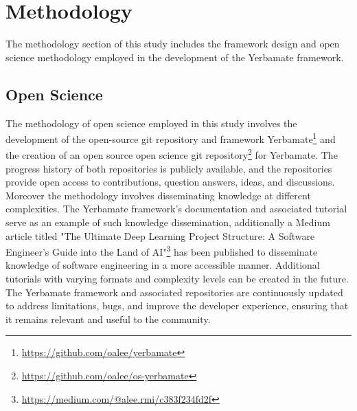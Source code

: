 


\section{Methodology}

The methodology section of this study includes the framework design and open science methodology employed in the development of the Yerbamate framework.


\subsection{Open Science}

The methodology of open science employed in this study involves the development of the open-source git repository and framework Yerbamate\footnote{\url{https://github.com/oalee/yerbamate}} and the creation of an open source open science git repository\footnote{\url{https://github.com/oalee/os-yerbamate}} for Yerbamate. The progress history of both repositories is publicly available, and the repositories provide open access to contributions, question answers, ideas, and discussions. Moreover the methodology involves disseminating knowledge at different complexities. The Yerbamate framework's documentation and associated tutorial serve as an example of such knowledge dissemination, additionally
  a Medium article titled "The Ultimate Deep Learning Project Structure: A Software Engineer’s Guide into the Land of AI"\footnote{\url{https://medium.com/@alee.rmi/c383f234fd2f}} has been published to disseminate knowledge of software engineering in a more accessible manner.
 Additional tutorials with varying formats and complexity levels can be created in the future.
 The Yerbamate framework and associated repositories are continuously updated to address limitations, bugs, and improve the developer experience, ensuring that it remains relevant and useful to the community.


